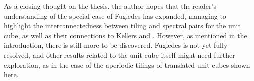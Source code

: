 \documentclass[../thesis.tex]{subfiles}
\begin{document}
As a closing thought on the thesis, the author hopes that the reader's understanding of the special case of Fugledes  has expanded, managing to highlight the interconnectedness between tiling and spectral pairs for the unit cube, as well as their connections to Kellers  and . However, as mentioned in the introduction, there is still more to be discovered. Fugledes  is not yet fully resolved, and other results related to the unit cube itself might need further exploration, as in the case of the aperiodic tilings of translated unit cubes shown here.  





\end{document}

